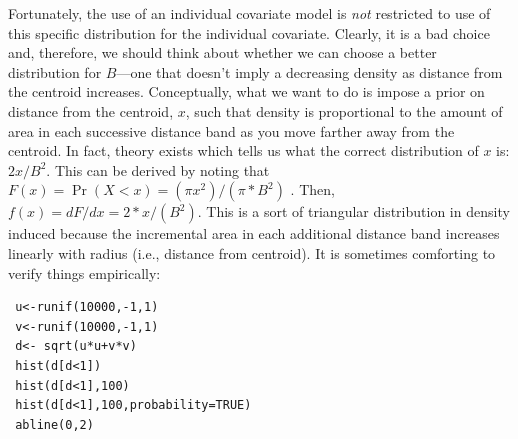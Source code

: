 Fortunately, the use of an individual covariate model is {\it not} restricted to
use of this specific distribution for the individual
covariate. Clearly, it is a bad choice and, therefore, we should think
about whether we can choose a better distribution for $B$---one that
doesn't imply a decreasing density as distance from the centroid
increases.  Conceptually, what we want to do is impose a prior on
distance from the centroid, $x$, such that density is proportional to
the amount of area in each successive distance band as you move
farther away from the centroid.  In fact, theory exists
which tells us what the correct distribution of $x$ is:
$2x/B^2$. This can be derived by noting that $F(x) = \Pr(X<x) =
(\pi x^2)/(\pi*B^{2})$ . Then, $f(x) = dF/dx =
2*x/(B^{2})$. This is a sort of triangular distribution in
density
induced because the incremental area in each additional distance band
increases linearly with radius (i.e., distance from centroid). It is
sometimes comforting to verify things empirically:
{\small
\begin{verbatim}
 u<-runif(10000,-1,1)
 v<-runif(10000,-1,1)
 d<- sqrt(u*u+v*v)
 hist(d[d<1])
 hist(d[d<1],100)
 hist(d[d<1],100,probability=TRUE)
 abline(0,2)
\end{verbatim}
}

